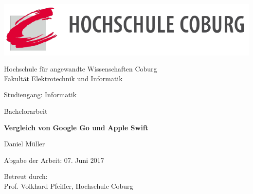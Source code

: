 \begin{titlepage}
    \begin{center}
    \includegraphics[width=\textwidth]{Images/logo}
        \begin{Large}
        Hochschule für angewandte Wissenschaften Coburg
        \\
        Fakultät Elektrotechnik und Informatik
        \par
        \end{Large}
        \vspace{2.0cm}
        
        \begin{Large}
            Studiengang: Informatik
            \par
        \end{Large}
        \vspace{1.5cm}
        
        {\Large
            Bachelorarbeit
        }
        \vspace{2.0cm}

        \begin{huge}
            \textbf{Vergleich von Google Go und Apple Swift} 
            \par
        \end{huge}        
        \vfill
        
        \begin{huge}
            Daniel Müller
        \end{huge}
        \vspace{2.0cm}
        
        \begin{large}
            Abgabe der Arbeit: 07. Juni 2017
            
            Betreut durch:
            \\
            Prof. Volkhard Pfeiffer, Hochschule Coburg
            \\
            \par
        \end{large}
        
    \end{center}
\end{titlepage}
\restoregeometry